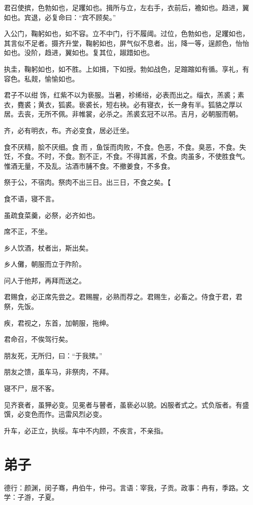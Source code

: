 \documentclass[a5paper]{ctexbook}
\begin{document}
    君召使摈，色勃如也，足躩如也。揖所与立，左右手，衣前后，襜如也。趋进，翼如也。宾退，必复命曰：“宾不顾矣。”

    入公门，鞠躬如也，如不容。立不中门，行不履阈。过位，色勃如也，足躩如也，其言似不足者。摄齐升堂，鞠躬如也，屏气似不息者。出，降一等，逞颜色，怡怡如也。没阶，趋进，翼如也。复其位，踧踖如也。

    执圭，鞠躬如也，如不胜。上如揖，下如授。勃如战色，足蹜蹜如有循。享礼，有容色。私觌，愉愉如也。

    君子不以绀𮉪饰，红紫不以为亵服。当暑，袗𫄨绤，必表而出之。缁衣，羔裘；素衣，麑裘；黄衣，狐裘。亵裘长，短右袂。必有寝衣，长一身有半。狐貉之厚以居。去丧，无所不佩。非帷裳，必杀之。羔裘玄冠不以吊。吉月，必朝服而朝。

    齐，必有明衣，布。齐必变食，居必迁坐。

    食不厌精，脍不厌细。食𮩞而𮩝，鱼馁而肉败，不食。色恶，不食。臭恶，不食。失饪，不食。不时，不食。割不正，不食。不得其酱，不食。肉虽多，不使胜食气。惟酒无量，不及乱。沽酒市脯不食。不撤姜食，不多食。

    祭于公，不宿肉。祭肉不出三日。出三日，不食之矣。【
    
    食不语，寝不言。
    
    虽疏食菜羹，必祭，必齐如也。

    席不正，不坐。
    
    乡人饮酒，杖者出，斯出矣。
    
    乡人儺，朝服而立于阼阶。
    
    问人于他邦，再拜而送之。

    君赐食，必正席先尝之。君赐腥，必熟而荐之。君赐生，必畜之。侍食于君，君祭，先饭。

    疾，君视之，东首，加朝服，拖绅。
    
    君命召，不俟驾行矣。

    朋友死，无所归，曰：“于我殡。”
    
    朋友之馈，虽车马，非祭肉，不拜。
    
    寝不尸，居不客。

    见齐衰者，虽狎必变。见冕者与瞽者，虽亵必以貌。凶服者式之。式负版者。有盛馔，必变色而作。迅雷风烈必变。

    升车，必正立，执绥。车中不内顾，不疾言，不亲指。

    \chapter{弟子}

    德行：颜渊，闵子骞，冉伯牛，仲弓。言语：宰我，子贡。政事：冉有，季路。文学：子游，子夏。
\end{document}
